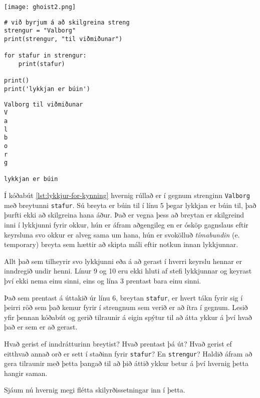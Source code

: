 	\begin{center}
		\texttt{[image: ghoist2.png]}
	\end{center}

\newpage {}

\begin{lstlisting}[caption=For lykkjur kynntar, label=lst:lykkjur-for-kynning]
# við byrjum á að skilgreina streng
strengur = "Valborg"
print(strengur, "til viðmiðunar")

for stafur in strengur:
	print(stafur)
	
print()
print('lykkjan er búin')
\end{lstlisting}
\lstset{style=uttak}
\begin{lstlisting}
Valborg til viðmiðunar
V
a
l
b
o
r
g

lykkjan er búin
\end{lstlisting}

Í kóðabút \ref{lst:lykkjur-for-kynning} hvernig rúllað er í gegnum strenginn \texttt{Valborg} með breytunni \texttt{stafur}.
Sú breyta er búin til í línu 5 þegar lykkjan er búin til, það þurfti ekki að skilgreina hana áður.
Það er vegna þess að breytan er skilgreind inni í lykkjunni fyrir okkur, hún er áfram aðgengileg en er ósköp gagnslaus eftir keyrsluna svo okkur er alveg sama um hana, hún er svokölluð \emph{tímabundin} (e. temporary) breyta sem hættir að skipta máli eftir notkun innan lykkjunnar.

Allt það sem tilheyrir svo lykkjunni eða á að gerast í hverri keyrslu hennar er inndregið undir henni.
Línur 9 og 10 eru ekki hluti af stefi lykkjunnar og keyrast því ekki nema einu sinni, eins og lína 3 prentast bara einu sinni.

Það sem prentast á úttakið úr línu 6, breytan \texttt{stafur}, er hvert tákn fyrir sig í þeirri röð sem það kemur fyrir í strengnum sem verið er að ítra í gegnum.
Lesið yfir þennan kóðabút og gerið tilraunir á eigin spýtur til að átta ykkur á því hvað það er sem er að gerast.

Hvað gerist ef inndrátturinn breytist?
Hvað prentast þá út?
Hvað gerist ef eitthvað annað orð er sett í staðinn fyrir \texttt{stafur}?
En \texttt{strengur}?
Haldið áfram að gera tilraunir með þetta þangað til að þið áttið ykkur betur á því hvernig þetta hangir saman.

Sjáum nú hvernig megi flétta skilyrðissetningar inn í þetta.


